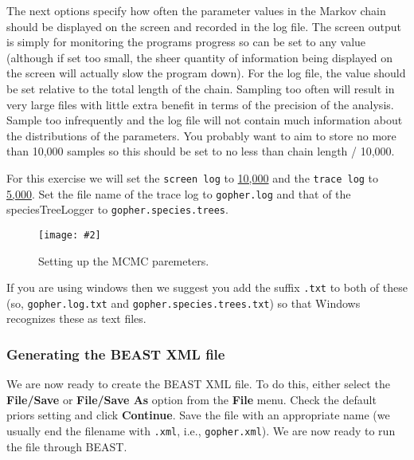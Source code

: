\documentclass{article}
\newcommand{\includeimage}[2][]{%
\texttt{[image: \#2]}
}
\newcommand{\logEvery}{{5,000}}
\newcommand{\screenEvery}{{10,000}}
\begin{document}
The next options specify how often the parameter values in the Markov
chain should be displayed on the screen and recorded in the log file.
The screen output is simply for monitoring the programs progress so
can be set to any value (although if set too small, the sheer quantity
of information being displayed on the screen will actually slow the
program down). For the log file, the value should be set relative
to the total length of the chain. Sampling too often will result in
very large files with little extra benefit in terms of the precision
of the analysis. Sample too infrequently and the log file will not
contain much information about the distributions of the parameters. 
You probably want to aim to store no more than 10,000 samples so this should be
set to no less than chain length / 10,000.

For this exercise we will set the \texttt{screen log} to \underline{\screenEvery{}} and the \texttt{trace log} to \underline{\logEvery{}}. 
Set the file name of the trace log to \texttt{gopher.log} and that of the speciesTreeLogger to \texttt{gopher.species.trees}.


\begin{figure}
\centering
\includeimage[width=\textwidth]{figures/BEAUti_MCMC}

\caption{\label{fig.MCMC} Setting up the MCMC paremeters.}
\end{figure}


If you are using windows then we suggest you add the suffix \texttt{.txt} to both of these (so,
\texttt{gopher.log.txt} and \texttt{gopher.species.trees.txt}) so that Windows recognizes
these as text files. 

\subsubsection*{Generating the BEAST XML file }

We are now ready to create the BEAST XML file. To do this, either select the {\bf File/Save} or {\bf File/Save As} option from the \textbf{File} menu. Check the default priors setting and click \textbf{Continue}. Save the file with an appropriate name (we usually end the filename with \texttt{.xml}, i.e., \texttt{gopher.xml}). We are now ready to run the file through BEAST. 
\end{document}
